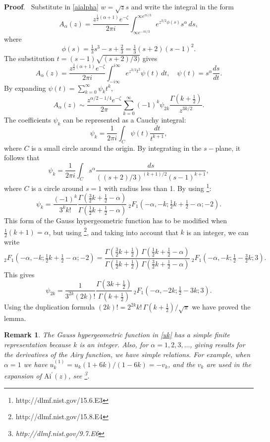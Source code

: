 \documentclass[11pt]{article}
\newtheorem{remark}{Remark}[section]
\begin{document}
\noindent
{\bf Proof}. \ Substitute in  \eqref{aialpha} $w=\sqrt{z}s$ and write the integral in the form
$$
A_{\alpha}(z) =\frac{z^{\frac12({\alpha}+1)}e^{-\zeta}}{2\pi i}
\int_{\infty e^{-\pi i/3}}^{\infty e^{\pi i/3}} e^{z^{3/2}\phi(s)}s^{\alpha}\,ds,
$$
where
$$
 \phi(s)=\tfrac13s^3-s+\tfrac23=\tfrac13(s+2)(s-1)^2.
$$
The substitution $t=(s-1)\sqrt{(s+2)/3)}$ gives
$$
A_{\alpha}(z) =\frac{z^{\frac12({\alpha}+1)}e^{-\zeta}}{2\pi i}
\int_{-i\infty }^{i\infty } e^{z^{3/2}t^2}\psi(t)\,dt,\quad  \psi(t)=s^{\alpha}\frac{ds}{dt}.
$$
By expanding $\psi(t)=\sum_{k=0}^\infty \psi_k t^k$,
$$
A_{\alpha}(z) \sim\frac{z^{{\alpha}/2-1/4}e^{-\zeta}}{2\pi}
\sum_{k=0}^\infty (-1)^k \psi_{2k}\frac{\Gamma(k+\tfrac12)}{z^{3k/2}}.
$$
The coefficients $\psi_k$ can be represented as a Cauchy integral:
$$
\psi_k=\frac{1}{2\pi i}\int_C \psi(t) \frac{dt}{t^{k+1}},
$$
where $C$ is a small circle around the origin. By integrating in the $s-$plane, it follows that
$$
\psi_k=\frac{1}{2\pi i}\int_C s^{\alpha} \frac{ds}{((s+2)/3)^{(k+1)/2}(s-1)^{k+1}},
$$
where  $C$ is a circle around $s=1$ with radius less than 1. By using {{\small \sc {}}}\footnote{http://dlmf.nist.gov/15.6.E3}:
$$
\psi_k=\frac{(-1)^k}{3^k k!}\frac{\Gamma(\frac32k+\frac12-{\alpha})}{\Gamma(\frac12k+\tfrac12-{\alpha})}\ 
{}_2F_1\left(-{\alpha},-k;\tfrac12 k+\tfrac12-{\alpha};-2\right).
$$
This form of the Gauss hypergeometric function has to be modified when $\tfrac12(k+1)={\alpha}$, but using 
 {{\small \sc \citeNP{{olde:10}}}}\footnote{http://dlmf.nist.gov/15.8.E4}, and taking into account that $k$ is an integer, we can write
$$
{}_2F_1\left(-{\alpha},-k;\tfrac12 k+\tfrac12-{\alpha};-2\right)=
\frac{\Gamma(\frac32 k+\frac12)\,\Gamma(\frac12k+\frac12-{\alpha})}
{\Gamma(\frac12 k+\frac12)\,\Gamma(\frac32 k+\frac12-{\alpha})}\ 
{}_2F_1\left(-{\alpha},-k;\tfrac12 -\tfrac32 k;3\right).
$$
This gives
$$
\psi_{2k}=\frac{1}{3^{2k} (2k)!}\frac{\Gamma(3k+\frac12)}{\Gamma(k+\tfrac12)}\ 
{}_2F_1\left(-{\alpha},-2k; \tfrac12-3k;3\right).
$$
Using the duplication formula $(2k)!=2^{2k}k!\,\Gamma(k+\frac12)/\sqrt{\pi}$ we have proved the lemma.

\bigskip
\begin{remark}
{\rm The Gauss hypergeometric function in \eqref{uk} has a simple finite representation because $k$ is an integer.  Also, for ${\alpha}=1,2,3,\ldots$, giving results for the derivatives  of the Airy function, we have simple relations. For example, when ${\alpha}=1$ we have $u_k^{(1)}=u_k(1+6k)/(1-6k)=-v_k$, and the $v_k$ are used in the expansion of ${\mbox{Ai}}^\prime(z)$, see {{\small \sc {}}}\footnote{http://dlmf.nist.gov/9.7.E6}.
}
\end{remark}
\end{document}
